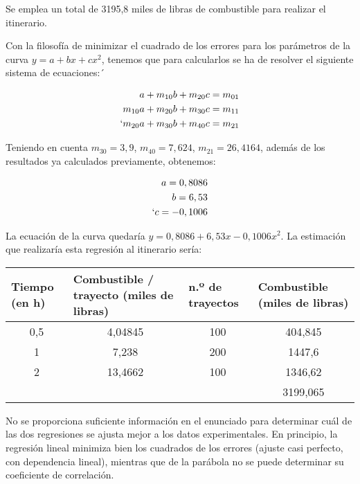 Se emplea un total de 3195,8 miles de libras de combustible para realizar el itinerario.

\subproblem

Con la filosofía de minimizar el cuadrado de los errores para los parámetros de la curva $y = a +bx+cx^2$, tenemos que para calcularlos se ha de resolver el siguiente sistema de ecuaciones:´

\begin{eqnarray}
\nonumber
a+ m_{10}b + m_{20}c = m_{01} \\
\nonumber
m_{10}a +m_{20}b + m_{30}c = m_{11} \\
\nonumber`
m_{20}a +m_{30}b + m_{40}c = m_{21}
\end{eqnarray}

Teniendo en cuenta $m_{30} = 3,9$, $m_{40}=7,624$, $m_{21} = 26,4164$, además de los resultados ya calculados previamente, obtenemos: 

\begin{eqnarray}
\nonumber
a=0,8086 \\
\nonumber
b=6,53 \\
\nonumber`
c=-0,1006
\end{eqnarray}

La ecuación de la curva quedaría $y=0,8086+6,53x-0,1006x^2$. La estimación que realizaría esta regresión al itinerario sería:
\tiny
	\begin{center}
		\begin{tabular}{|c|c|c|c|}
			\hline
			\multicolumn{1}{|l|}{Tiempo (en h)} & \multicolumn{1}{l|}{Combustible / trayecto (miles de libras)} & \multicolumn{1}{l|}{n.º de trayectos} & \multicolumn{1}{l|}{Combustible (miles de libras)} \\ \hline
			0,5 & 4,04845 & 100 & 404,845 \\ 
			1 & 7,238 & 200 & 1447,6 \\ 
			2 & 13,4662 & 100 & 1346,62 \\ \hline
			\multicolumn{1}{|l|}{} & \multicolumn{1}{l|}{} &  & 3199,065 \\ \hline
		\end{tabular}
	\end{center}
\normalsize


\subproblem

No se proporciona suficiente información en el enunciado para determinar cuál de las dos regresiones se ajusta mejor a los datos experimentales. En principio, la regresión lineal minimiza bien los cuadrados de los errores (ajuste casi perfecto, con dependencia lineal), mientras que de la parábola no se puede determinar su coeficiente de correlación. 